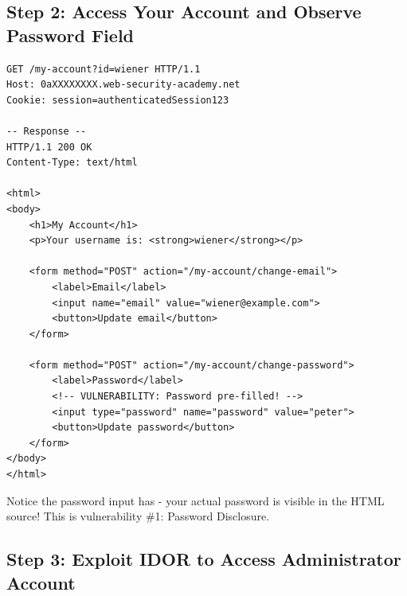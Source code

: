 \documentclass[11pt,letterpaper]{article}
\newcommand{\inlinecode}[1]{\texttt{\detokenize{#1}}}
\begin{document}
\subsection{Step 2: Access Your Account and Observe Password Field}

\begin{listing}[H]
\begin{verbatim}
GET /my-account?id=wiener HTTP/1.1
Host: 0aXXXXXXXX.web-security-academy.net
Cookie: session=authenticatedSession123

-- Response --
HTTP/1.1 200 OK
Content-Type: text/html

<html>
<body>
    <h1>My Account</h1>
    <p>Your username is: <strong>wiener</strong></p>

    <form method="POST" action="/my-account/change-email">
        <label>Email</label>
        <input name="email" value="wiener@example.com">
        <button>Update email</button>
    </form>

    <form method="POST" action="/my-account/change-password">
        <label>Password</label>
        <!-- VULNERABILITY: Password pre-filled! -->
        <input type="password" name="password" value="peter">
        <button>Update password</button>
    </form>
</body>
</html>
\end{verbatim}
\caption{Step 2: Observe password disclosure on own account}
\end{listing}

\begin{tipbox}
Notice the password input has \inlinecode{value="peter"} - your actual password is visible in the HTML source! This is vulnerability \#1: Password Disclosure.
\end{tipbox}

\subsection{Step 3: Exploit IDOR to Access Administrator Account}
\end{document}
